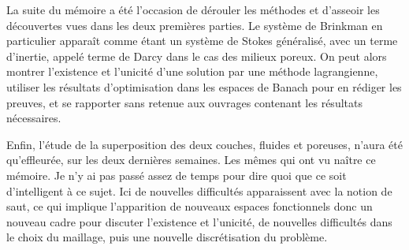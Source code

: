 La suite du mémoire a été l'occasion de dérouler les méthodes et d'asseoir les découvertes vues dans les deux premières parties. Le système de Brinkman en particulier apparaît comme étant un système de Stokes généralisé, avec un terme d'inertie, appelé terme de Darcy dans le cas des milieux poreux. On peut alors montrer l'existence et l'unicité d'une solution par une méthode lagrangienne, utiliser les résultats d'optimisation dans les espaces de Banach pour en rédiger les preuves, et se rapporter sans retenue aux ouvrages contenant les résultats nécessaires.

Enfin, l'étude de la superposition des deux couches, fluides et poreuses, n'aura été qu'effleurée, sur les deux dernières semaines. Les mêmes qui ont vu naître ce mémoire. Je n'y ai pas passé assez de temps pour dire quoi que ce soit d'intelligent à ce sujet. Ici de nouvelles difficultés apparaissent avec la notion de saut, ce qui implique l'apparition de nouveaux espaces fonctionnels donc un nouveau cadre pour discuter l'existence et l'unicité, de nouvelles difficultés dans le choix du maillage, puis une nouvelle discrétisation du problème.